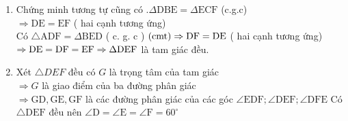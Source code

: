 \begin{bt}
{\begin{enumerate}
			$\angle \mathrm{A}=\angle \mathrm{B}\left(=60^{\circ}\right)$\\[5px]
			$\mathrm{AF}=\mathrm{BD}\left(=\frac{1}{3} \mathrm{a}\right)$\\[5px]
			$\Rightarrow \triangle \mathrm{ADF}=\triangle \mathrm{BED}($ c. g. c)\\[5px]
			$\Rightarrow \angle \mathrm{AFD}=\angle \mathrm{BDE}$ ( hai góc tương ứng)\\[5px]
			Mà $\angle \mathrm{BDE}=90^{\circ} \\[5px]
			\Rightarrow \angle \mathrm{AFD}=90^{\circ}$ hay $\mathrm{DF} \perp \mathrm{AC}$
			\item Chứng minh tương tự cũng có $. \Delta \mathrm{DBE}=\Delta \mathrm{ECF}$ (c.g.c)\\[5px] 
			$\Rightarrow \mathrm{DE}=\mathrm{EF}$ ( hai cạnh tương ứng)\\[5px] 
			Có $\triangle \mathrm{ADF}=\Delta \mathrm{BED}$ ( c. g. $\mathrm{c}$ ) $(\mathrm{cmt})\\[5px] 
			\Rightarrow \mathrm{DF}=\mathrm{DE}$ ( hai cạnh tương ứng)\\[5px] 
			$\Rightarrow \mathrm{DE}=\mathrm{DF}=\mathrm{EF}\\[5px] \Rightarrow \Delta \mathrm{DEF}$ là tam giác đều.
			\item Xét $\triangle D E F$ đều có $G$ là trọng tâm của tam giác\\[5px] 
			$\Rightarrow G$ là giao điểm của ba đường phân giác\\[5px] 
			$\Rightarrow \mathrm{GD}, \mathrm{GE}, \mathrm{GF}$ là các đường phân giác của các góc $\angle \mathrm{EDF} ; \angle \mathrm{DEF} ; \angle \mathrm{DFE}$ Có $\triangle \mathrm{DEF}$ đều nên $\angle \mathrm{D}=\angle \mathrm{E}=\angle \mathrm{F}=60^{\circ}$
		\end{enumerate}
	}
\end{bt}

